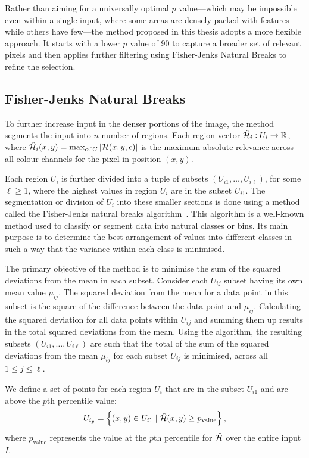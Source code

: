 Rather than aiming for a universally optimal \( p \) value—which may be impossible even within a single input, where some areas are densely packed with features while others have few—the method proposed in this thesis adopts a more flexible approach. It starts with a lower \( p \) value of 90 to capture a broader set of relevant pixels and then applies further filtering using Fisher-Jenks Natural Breaks to refine the selection.

\subsection{Fisher-Jenks Natural Breaks}
\label{sec:fjnb}

To further increase input in the denser portions of the image, the method segments the input into \( n \) number of regions. Each region vector \( \hat{\mathcal{H}}_i: U_i \to \mathbb{R} \), where \( \hat{\mathcal{H}}_i(x, y) = \max_{c \in C} |\mathcal{H}(x, y, c)| \) is the maximum absolute relevance across all colour channels for the pixel in position \( (x, y) \). 

Each region \( U_i \) is further divided into a tuple of subsets \( (U_{i1}, \dots, U_{i\ell}) \), for some \( \ell \geq 1 \), where the highest values in region \( U_i \) are in the subset \( U_{i1} \). The segmentation or division of \( U_i \) into these smaller sections is done using a method called the Fisher-Jenks natural breaks algorithm~\cite{fisher1958grouping}. This algorithm is a well-known method used to classify or segment data into natural classes or bins. Its main purpose is to determine the best arrangement of values into different classes in such a way that the variance within each class is minimised.

The primary objective of the method is to minimise the sum of the squared deviations from the mean in each subset. Consider each \( U_{ij} \) subset having its own mean value \( \mu_{ij} \). The squared deviation from the mean for a data point in this subset is the square of the difference between the data point and \( \mu_{ij} \). Calculating the squared deviation for all data points within \( U_{ij} \) and summing them up results in the total squared deviations from the mean. Using the algorithm, the resulting subsets \( (U_{i1}, \dots, U_{i\ell}) \) are such that the total of the sum of the squared deviations from the mean \( \mu_{ij} \) for each subset \( U_{ij} \) is minimised, across all \( 1 \leq j \leq \ell \).

We define a set of points for each region \( U_i \) that are in the subset \( U_{i1} \) and are above the \( p \)th percentile value:
\begin{equation*}
    U_{i_p} = \left\{ (x, y) \in U_{i1} \mid \hat{\mathcal{H}}(x, y) \geq p_{\text{value}} \right\},
\end{equation*}
where \( p_{\text{value}} \) represents the value at the \( p \)th percentile for \( \hat{\mathcal{H}} \) over the entire input \( I \).

